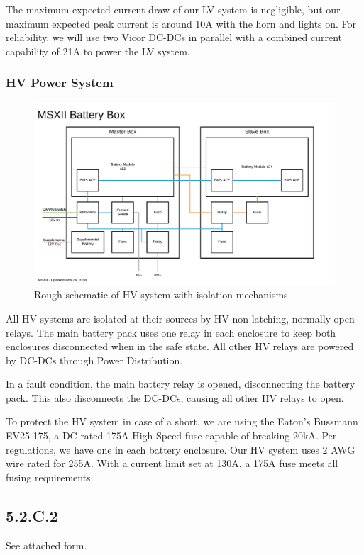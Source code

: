 \documentclass[10pt]{article}
\begin{document}
The maximum expected current draw of our LV system is negligible, but our maximum expected peak current is around 10A with the horn and lights on. For reliability, we will use two Vicor DC-DCs in parallel with a combined current capability of 21A to power the LV system.

\subsubsection{HV Power System}

\begin{figure}[H]
    \centering
    \includegraphics[width=\textwidth,page=2]{figures/msxii-block-diagrams}
    \caption{Rough schematic of HV system with isolation mechanisms}
    \label{fig:msxii-electrical-hv-system}
\end{figure}

All HV systems are isolated at their sources by HV non-latching, normally-open relays. The main battery pack uses one relay in each enclosure to keep both enclosures disconnected when in the safe state. All other HV relays are powered by DC-DCs through Power Distribution.

In a fault condition, the main battery relay is opened, disconnecting the battery pack. This also disconnects the DC-DCs, causing all other HV relays to open.

To protect the HV system in case of a short, we are using the Eaton's Bussmann EV25-175, a DC-rated 175A High-Speed fuse capable of breaking 20kA. Per regulations, we have one in each battery enclosure. Our HV system uses 2 AWG wire rated for 255A. With a current limit set at 130A, a 175A fuse meets all fusing requirements.





\subsection{5.2.C.2}

See attached form.




\pagebreak
\appendix
\end{document}
